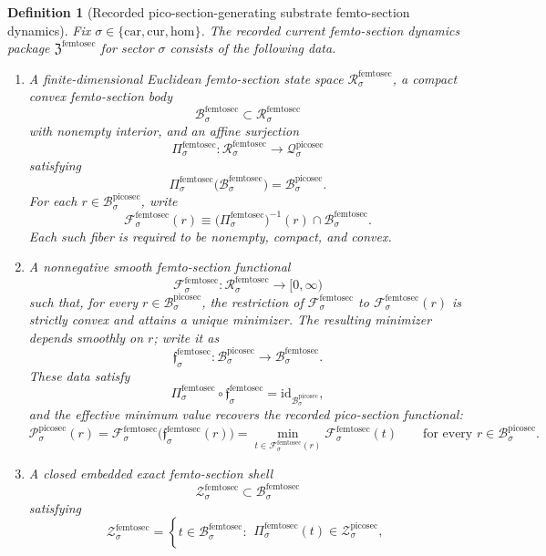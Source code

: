\documentclass[11pt]{article}
\newcommand{\Car}{\mathrm{car}}
\newcommand{\Cur}{\mathrm{cur}}
\newcommand{\Hom}{\mathrm{hom}}
\newcommand{\PicoSectionSpace}[1]{\mathcal Q_{#1}^{\mathrm{picosec}}}
\newcommand{\PicoSectionBody}[1]{\mathcal B_{#1}^{\mathrm{picosec}}}
\newcommand{\PicoSectionFunctional}[1]{\mathscr P_{#1}^{\mathrm{picosec}}}
\newcommand{\PicoSectionShell}[1]{\mathcal Z_{#1}^{\mathrm{picosec}}}
\newcommand{\FemtoSectionPackage}{\mathfrak Z^{\mathrm{femtosec}}}
\newcommand{\FemtoSectionSpace}[1]{\mathcal R_{#1}^{\mathrm{femtosec}}}
\newcommand{\FemtoSectionBody}[1]{\mathcal B_{#1}^{\mathrm{femtosec}}}
\newcommand{\FemtoSectionProj}[1]{\Pi_{#1}^{\mathrm{femtosec}}}
\newcommand{\FemtoSectionFiber}[2]{\mathcal F_{#1}^{\mathrm{femtosec}}(#2)}
\newcommand{\FemtoSectionPicoMin}[1]{\mathfrak f_{#1}^{\mathrm{femtosec}}}
\newcommand{\FemtoSectionFunctional}[1]{\mathscr F_{#1}^{\mathrm{femtosec}}}
\newcommand{\FemtoSectionShell}[1]{\mathcal Z_{#1}^{\mathrm{femtosec}}}
\newtheorem{definition}{Definition}
\begin{document}
\begin{definition}[Recorded pico-section-generating substrate femto-section dynamics]
\label{def:femtosec}
Fix \(\sigma\in\{\Car,\Cur,\Hom\}\). The recorded current femto-section dynamics package \(\FemtoSectionPackage\) for sector \(\sigma\) consists of the following data.
\begin{enumerate}
    \item A finite-dimensional Euclidean femto-section state space \(\FemtoSectionSpace{\sigma}\), a compact convex femto-section body
    \[
    \FemtoSectionBody{\sigma}\subset\FemtoSectionSpace{\sigma}
    \]
    with nonempty interior, and an affine surjection
    \[
    \FemtoSectionProj{\sigma}:\FemtoSectionSpace{\sigma}\to\PicoSectionSpace{\sigma}
    \]
    satisfying
    \[
    \FemtoSectionProj{\sigma}\bigl(\FemtoSectionBody{\sigma}\bigr)=\PicoSectionBody{\sigma}.
    \]
    For each \(r\in\PicoSectionBody{\sigma}\), write
    \[
    \FemtoSectionFiber{\sigma}{r}
    \equiv
    \bigl(\FemtoSectionProj{\sigma}\bigr)^{-1}(r)\cap\FemtoSectionBody{\sigma}.
    \]
    Each such fiber is required to be nonempty, compact, and convex.
    \item A nonnegative smooth femto-section functional
    \[
    \FemtoSectionFunctional{\sigma}:\FemtoSectionSpace{\sigma}\to[0,\infty)
    \]
    such that, for every \(r\in\PicoSectionBody{\sigma}\), the restriction of \(\FemtoSectionFunctional{\sigma}\) to \(\FemtoSectionFiber{\sigma}{r}\) is strictly convex and attains a unique minimizer. The resulting minimizer depends smoothly on \(r\); write it as
    \[
    \FemtoSectionPicoMin{\sigma}:\PicoSectionBody{\sigma}\to\FemtoSectionBody{\sigma}.
    \]
    These data satisfy
    \[
    \FemtoSectionProj{\sigma}\circ\FemtoSectionPicoMin{\sigma}
    =
    \mathrm{id}_{\PicoSectionBody{\sigma}},
    \]
    and the effective minimum value recovers the recorded pico-section functional:
    \[
    \PicoSectionFunctional{\sigma}(r)
    =
    \FemtoSectionFunctional{\sigma}\bigl(\FemtoSectionPicoMin{\sigma}(r)\bigr)
    =
    \min_{t\in\FemtoSectionFiber{\sigma}{r}}
    \FemtoSectionFunctional{\sigma}(t)
    \qquad
    \text{for every }
    r\in\PicoSectionBody{\sigma}.
    \]
    \item A closed embedded exact femto-section shell
    \[
    \FemtoSectionShell{\sigma}\subset\FemtoSectionBody{\sigma}
    \]
    satisfying
    \[
    \FemtoSectionShell{\sigma}
    =
    \left\{
    t\in\FemtoSectionBody{\sigma}:
    \begin{array}{l}
    \FemtoSectionProj{\sigma}(t)\in\PicoSectionShell{\sigma},\\[0.2em]

\end{array}\]
\end{enumerate}
\end{definition}
\end{document}
